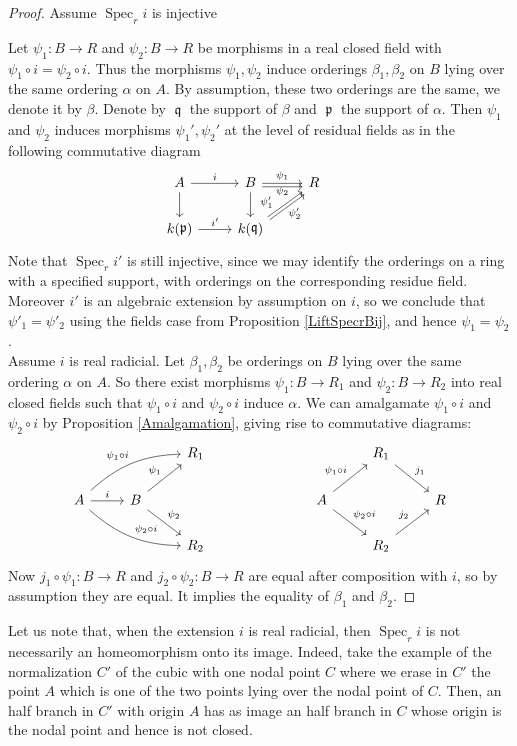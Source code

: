 \documentclass[12pt]{amsart}
\theoremstyle{definition}
\DeclareMathOperator{\Sp}{Spec}
\DeclareMathOperator{\p}{\mathfrak{p}}
\DeclareMathOperator{\q}{{\mathfrak q}}
\begin{document}
\begin{proof} Assume $\Sp_r i$ is injective

Let $\psi_1:B\to R$ and $\psi_2:B\to R$ be morphisms in a real closed field with $\psi_1 \circ i=\psi_2 \circ i$. Thus the morphisms $\psi_1,\psi_2$ induce orderings $\beta_1,\beta_2$ on $B$ lying over the same ordering $\alpha$ on $A$. By assumption, these two orderings are the same, we denote it by $\beta$. Denote by $\q$ the support of $\beta$ and $\p$ the support of $\alpha$. Then $\psi_1$ and $\psi_2$ induces morphisms $\psi_1',\psi_2'$ at the level of residual fields as in the following commutative diagram
$$\begin{tikzcd}
A \arrow[r,"i"] \arrow[d] & B \arrow[d] \arrow[r, "\psi_2"', "\psi_1"] \arrow[r,shift right]& R & \\
k(\p) \arrow[r,"i'"]  & k(\q) \arrow[ur,swap,"\psi_2'", "\psi'_1"'near start] \arrow[ur, shift right] &&
\end{tikzcd}$$
Note that $\Sp_r i'$ is still injective, since we may identify the orderings on a ring with a specified support, with orderings on the corresponding residue field. Moreover $i'$ is an algebraic extension by assumption on $i$, so we conclude that $\psi'_1=\psi'_2$ using the fields case from Proposition \ref{LiftSpecrBij}, and hence $\psi_1=\psi_2$.\\

Assume $i$ is  real radicial.
Let $\beta_1,\beta_2$ be orderings on $B$ lying over the same ordering $\alpha$ on $A$. So there exist morphisms $\psi_1:B\to R_1$ and $\psi_2:B\to R_2$ into real closed fields such that $\psi_1\circ i$ and $\psi_2\circ i$ induce $\alpha$. We can amalgamate $\psi_1\circ i$ and $\psi_2\circ i$ by Proposition \ref{Amalgamation}, giving rise to commutative diagrams:
$$\begin{tikzcd}
& & R_1 &&& & R_1 \arrow[dr,"j_1"]& \\
A \arrow[r,"i"] \arrow[urr, "\psi_1\circ i", bend left=20]\arrow[drr, "\psi_2\circ i", bend right=20] &B  \arrow[dr, "\psi_2"] \arrow[ur, "\psi_1"] &   &&& A \arrow[ur,"\psi_1\circ i"] \arrow[dr,"\psi_2\circ i"] & & R \\
&& R_2 &&& & R_2 \arrow[ur,"j_2"]&
\end{tikzcd}$$
Now $j_1\circ \psi_1:B\to R$ and $j_2\circ \psi_2:B\to R$ are equal after composition with $i$, so by assumption they are equal. It implies the equality of $\beta_1$ and $\beta_2$.
\end{proof}


Let us note that, when the extension $i$ is real radicial, then $\Sp_r i$ is not necessarily an homeomorphism onto its image. Indeed, take the example of the normalization $C'$ of the cubic with one nodal point $C$ where we erase in $C'$ the point $A$ which is one of the two points lying over the nodal point of $C$. Then, an half branch in $C'$ with origin $A$ has as image an half branch in $C$ whose origin is the nodal point and hence is not closed.
\end{document}
